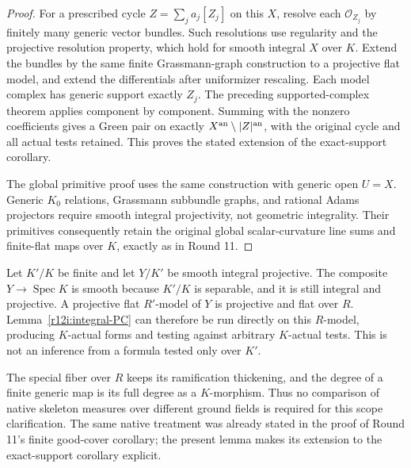 \begin{proof}
For a prescribed cycle $Z=\sum_j a_j[Z_j]$ on this $X$, resolve each
$\mathcal O_{Z_j}$ by finitely many generic vector bundles.  Such
resolutions use regularity and the projective resolution property,
which hold for smooth integral $X$ over $K$.  Extend the bundles by
the same finite Grassmann-graph construction to a projective flat
model, and extend the differentials after uniformizer rescaling.
Each model complex has generic support exactly $Z_j$.  The preceding
supported-complex theorem applies component by component.  Summing
with the nonzero coefficients gives a Green pair on exactly
$X^{\rm an}\setminus|Z|^{\rm an}$, with the original cycle and all
actual tests retained.  This proves the stated extension of the
exact-support corollary.

The global primitive proof uses the same construction with generic
open $U=X$.  Generic $K_0$ relations, Grassmann subbundle graphs,
and rational Adams projectors require smooth integral projectivity,
not geometric integrality.  Their primitives consequently retain
the original global scalar-curvature line sums and finite-flat maps
over $K$, exactly as in Round 11.
\end{proof}

\begin{remark}
Let $K'/K$ be finite and let $Y/K'$ be smooth integral projective.
The composite $Y\to\operatorname{Spec}K$ is smooth because
$K'/K$ is separable, and it is still integral and projective.
A projective flat $R'$-model of $Y$ is projective and flat over $R$.
Lemma~\ref{r12i:integral-PC} can therefore be run directly on this
$R$-model, producing $K$-actual forms and testing against arbitrary
$K$-actual tests.  This is not an inference from a formula tested
only over $K'$.

The special fiber over $R$ keeps its ramification thickening, and
the degree of a finite generic map is its full degree as a
$K$-morphism.  Thus no comparison of native skeleton measures over
different ground fields is required for this scope clarification.
The same native treatment was already stated in the proof of
Round 11's finite good-cover corollary; the present lemma makes its
extension to the exact-support corollary explicit.
\end{remark}
